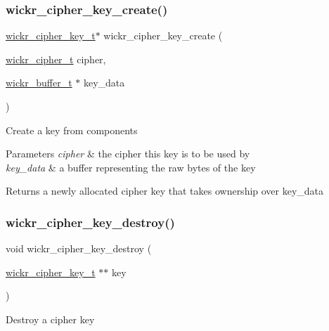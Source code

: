 \subsubsection{\texorpdfstring{wickr\+\_\+cipher\+\_\+key\+\_\+create()}{wickr\_cipher\_key\_create()}}
{\footnotesize\ttfamily \hyperlink{structwickr__cipher__key}{wickr\+\_\+cipher\+\_\+key\+\_\+t}$\ast$ wickr\+\_\+cipher\+\_\+key\+\_\+create (\begin{DoxyParamCaption}\item[{\hyperlink{structwickr__cipher}{wickr\+\_\+cipher\+\_\+t}}]{cipher,  }\item[{\hyperlink{structwickr__buffer}{wickr\+\_\+buffer\+\_\+t} $\ast$}]{key\+\_\+data }\end{DoxyParamCaption})}

Create a key from components


\begin{DoxyParams}{Parameters}
{\em cipher} & the cipher this key is to be used by \\
\hline
{\em key\+\_\+data} & a buffer representing the raw bytes of the key \\
\hline
\end{DoxyParams}
\begin{DoxyReturn}{Returns}
a newly allocated cipher key that takes ownership over \textquotesingle{}key\+\_\+data\textquotesingle{} 
\end{DoxyReturn}
\mbox{\label{group__wickr__cipher_ga45790b3023ccb261c03346b069aca763}} 
\subsubsection{\texorpdfstring{wickr\+\_\+cipher\+\_\+key\+\_\+destroy()}{wickr\_cipher\_key\_destroy()}}
{\footnotesize\ttfamily void wickr\+\_\+cipher\+\_\+key\+\_\+destroy (\begin{DoxyParamCaption}\item[{\hyperlink{structwickr__cipher__key}{wickr\+\_\+cipher\+\_\+key\+\_\+t} $\ast$$\ast$}]{key }\end{DoxyParamCaption})}

Destroy a cipher key


